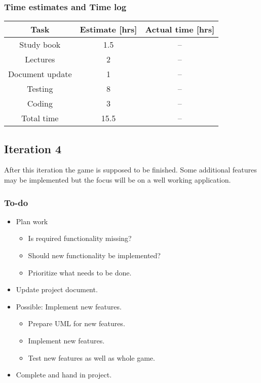 \documentclass[12pt, letterpaper]{article}
\begin{document}
\subsubsection{Time estimates and Time log}
\begin{center}
	\begin{tabular}{|c|c|c|} 
		\hline
		Task & Estimate [hrs] & Actual time [hrs]\\ [0.5ex] 
		\hline\hline
		Study book & 1.5 & --\\
		\hline
		Lectures & 2 & -- \\
		\hline 
		Document update & 1 & -- \\
		\hline 
		Testing & 8 & --\\
		\hline
		Coding & 3 & --\\ 
		\hline
		Total time & 15.5 & -- \\ [1ex]
		\hline 
	\end{tabular}
\end{center}
\subsection{Iteration 4}
After this iteration the game is supposed to be finished. Some additional features may be implemented but the focus will be on a well working application.
\subsubsection{To-do}
\begin{itemize}
	\item Plan work
	\begin{itemize}
		\item Is required functionality missing?
		\item Should new functionality be implemented?
		\item Prioritize what needs to be done.
	\end{itemize}
	\item Update project document.
	\item Possible: Implement new features.
	\begin{itemize}
		\item Prepare UML for new features.
		\item Implement new features.
		\item Test new features as well as whole game.
	\end{itemize}
	\item Complete and hand in project.
\end{itemize}
\end{document}
